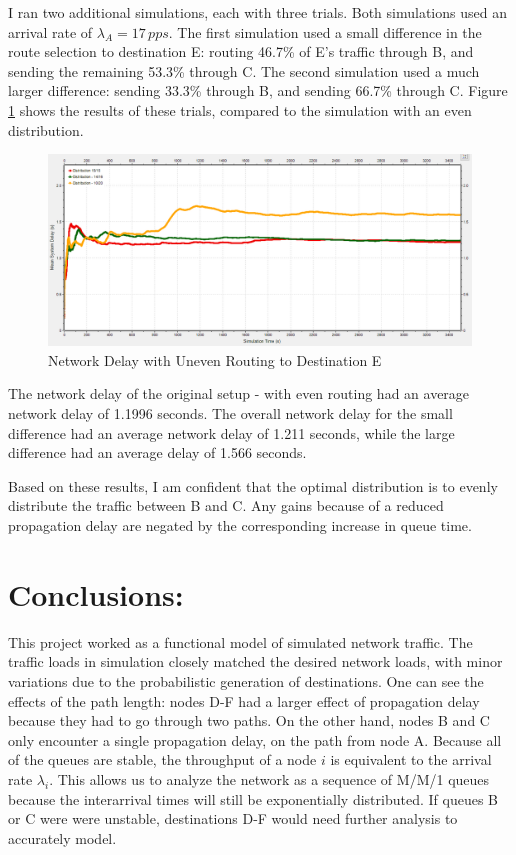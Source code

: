 \documentclass{article}
\begin{document}
I ran two additional simulations, each with three trials.
Both simulations used an arrival rate of $\lambda_A = 17 \, pps$.
The first simulation used a small difference in the route selection to destination E:  routing 46.7\% of E's traffic through B, and sending the remaining 53.3\% through C. 
The second simulation used a much larger difference:  sending 33.3\% through B, and sending 66.7\% through C.
Figure \ref{fig:unevenDelay} shows the results of these trials, compared to the simulation with an even distribution.

\begin{figure}[h!]
\centering
\includegraphics[scale=0.5]{Images/UnevenDist.PNG}
\caption{Network Delay with Uneven Routing to Destination E}
\label{fig:unevenDelay}
\end{figure}

The network delay of the original setup - with even routing had an average network delay of 1.1996 seconds.
The overall network delay for the small difference had an average network delay of 1.211 seconds, while the large difference had an average delay of 1.566 seconds.

Based on these results, I am confident that the optimal distribution is to evenly distribute the traffic between B and C.
Any gains because of a reduced propagation delay are negated by the corresponding increase in queue time.

\section{Conclusions:}
\label{sec:Conclusions}
This project worked as a functional model of simulated network traffic.
The traffic loads in simulation closely matched the desired network loads, with minor variations due to the probabilistic generation of destinations.
One can see the effects of the path length:  nodes D-F had a larger effect of propagation delay because they had to go through two paths.
On the other hand, nodes B and C only encounter a single propagation delay, on the path from node A.
Because all of the queues are stable, the throughput of a node $i$ is equivalent to the arrival rate $\lambda_i$.
This allows us to analyze the network as a sequence of M/M/1 queues because the interarrival times will still be exponentially distributed.
If queues B or C were were unstable, destinations D-F would need further analysis to accurately model.
\end{document}
